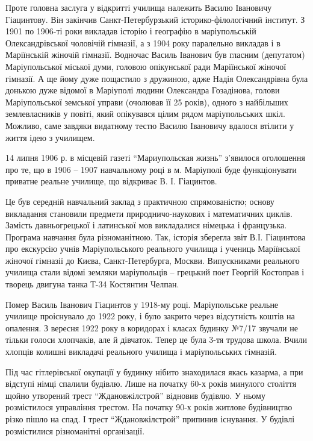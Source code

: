 
Проте головна заслуга у відкритті училища належить Василю Івановичу Гіацинтову.
Він закінчив Санкт-Петербурзький історико-філологічний інститут. З 1901 по
1906-ті роки викладав історію і географію в маріупольській Олександрівської
чоловічій гімназії, а з 1904 року паралельно викладав і в Маріїнській жіночій
гімназії. Водночас Василь Іванович був гласним (депутатом) Маріупольської
міської думи, головою опікунської ради Маріїнської жіночої гімназії. А ще йому
дуже пощастило з дружиною, адже Надія Олександрівна була донькою дуже відомої в
Маріуполі людини Олександра Гозадінова, голови Маріупольської земської управи
(очолював її 25 років), одного з найбільших землевласників у повіті, який
опікувався цілим рядом маріупольських шкіл. Можливо, саме завдяки видатному
тестю Василю Івановичу вдалося втілити у життя ідею з училищем.

14 липня 1906 р. в місцевій газеті \enquote{Мариупольская жизнь} з'явилося
оголошення про те, що в 1906 – 1907 навчальному році в м. Маріуполі буде
функціонувати приватне реальне училище, що відкриває В. І. Гіацинтов.


Це був середній навчальний заклад з практичною спрямованістю; основу викладання
становили предмети природничо-наукових і математичних циклів. Замість
давньогрецької і латинської мов викладалися німецька і французька. Програма
навчання була різноманітною. Так, історія зберегла звіт В.І. Гіацинтова про
екскурсію учнів Маріупольського реального училища і учениць Маріїнської жіночої
гімназії до Києва, Санкт-Петербурга, Москви.  Випускниками реального училища
стали відомі земляки маріупольців – грецький поет Георгій Костоправ і творець
двигуна танка Т-34 Костянтин Челпан.


Помер Василь Іванович Гіацинтов у 1918-му році. Маріупольське реальне училище
проіснувало до 1922 року, і було закрито через відсутність коштів на опалення.
З вересня 1922 року в коридорах і класах будинку №7/17 звучали не тільки голоси
хлопчаків, але й дівчаток. Тепер це була 3-тя трудова школа. Вчили хлопців
колишні викладачі реального училища і маріупольських гімназій.

Під час гітлерівської окупації у будинку нібито знаходилася якась казарма, а
при відступі німці спалили будівлю. Лише на початку 60-х років минулого
століття щойно утворений трест \enquote{Ждановжілстрой} відновив будівлю. У ньому
розмістилося управління трестом. На початку 90-х років житлове будівництво
різко пішло на спад. І трест \enquote{Ждановжілстрой} припинив існування. У будівлі
розмістилися різноманітні організації. 

